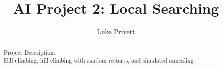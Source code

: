 \documentclass[]{report}
\title{AI Project 2: Local Searching}
\author{Luke Privett}
\begin{document}
\maketitle

\begin{abstract}
	Project Description:\\ Hill climbing, hill climbing with random restarts, and simulated annealing
	
\end{abstract}
\end{document}

